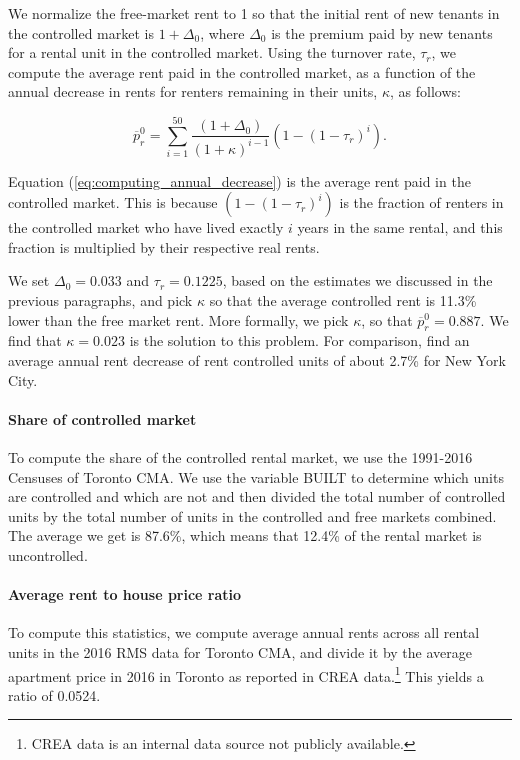 \documentclass[parskip=full]{article}
\begin{document}
We normalize the free-market rent to 1 so that the initial rent of new tenants in the controlled market is $1+\Delta_{0}$, where $\Delta_{0}$ is the premium paid by new tenants for a rental unit in the controlled market. Using the turnover rate, $\tau_{r}$, we compute the average rent paid in the controlled market, as a function of the annual decrease in rents for renters remaining in their units, $\kappa$, as follows:

\begin{equation}\label{eq:computing_annual_decrease}
    \overline{p}^{0}_{r}=\sum_{i=1}^{50}\frac{(1+\Delta_{0})}{(1+\kappa)^{i-1}}(1-(1-\tau_{r})^{i}).
\end{equation}

\noindent Equation (\ref{eq:computing_annual_decrease}) is the average rent paid in the controlled market. This is because $(1-(1-\tau_{r})^{i})$ is the fraction of renters in the controlled market who have lived exactly $i$ years in the same rental, and this fraction is multiplied by their respective real rents.

We set $\Delta_{0}=0.033$ and $\tau_{r}=0.1225$, based on the estimates we discussed in the previous paragraphs, and pick $\kappa$ so that the average controlled rent is 11.3\% lower than the free market rent. More formally, we pick $\kappa$, so that $\overline{p}^{0}_{r}=0.887$. We find that $\kappa=0.023$ is the solution to this problem. For comparison, \citet{fmn-2022} find an average annual rent decrease of rent controlled units of about 2.7\% for New York City.

\paragraph{Share of controlled market}

To compute the share of the controlled rental market, we use the 1991-2016 Censuses of Toronto CMA. We use the variable BUILT to determine which units are controlled and which are not and then divided the total number of controlled units by the total number of units in the controlled and free markets combined. The average we get is 87.6\%, which means that 12.4\% of the rental market is uncontrolled. 

\paragraph{Average rent to house price ratio}

To compute this statistics, we compute average annual rents across all rental units in the 2016 RMS data for Toronto CMA, and divide it by the average apartment price in 2016 in Toronto as reported in CREA data.\footnote{CREA data is an internal data source not publicly available.} This yields a ratio of 0.0524.
\end{document}
